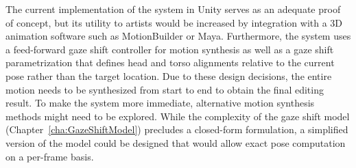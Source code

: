 The current implementation of the system in Unity serves as an adequate proof of concept, but its utility to artists would be increased by integration with a 3D animation software such as MotionBuilder or Maya. Furthermore, the system uses a feed-forward gaze shift controller for motion synthesis as well as a gaze shift parametrization that defines head and torso alignments relative to the current pose rather than the target location. Due to these design decisions, the entire motion needs to be synthesized from start to end to obtain the final editing result. To make the system more immediate, alternative motion synthesis methods might need to be explored. While the complexity of the gaze shift model (Chapter~\ref{cha:GazeShiftModel}) precludes a closed-form formulation, a simplified version of the model could be designed that would allow exact pose computation on a per-frame basis.
